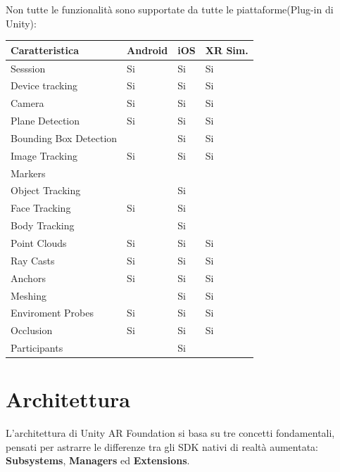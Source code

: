 \begin{center}
Non tutte le funzionalità sono supportate da tutte le piattaforme(Plug-in di Unity):

\begin{tabular}{| l | p{2cm} | p{2cm} |p{2cm} |}
      \hline
      \rowcolor{gray!30}
      \textbf{Caratteristica} & \textbf{Android} & \textbf{iOS} & \textbf{XR Sim.} \\ 
      \hline
      Sesssion & Si & Si & Si\\ 
      \hline
      Device tracking & Si & Si & Si \\ 
      \hline
      Camera & Si & Si & Si \\ 
      \hline
      Plane Detection & Si & Si & Si \\ 
      \hline
      Bounding Box Detection & & Si & Si\\ 
      \hline
      Image Tracking & Si & Si & Si\\ 
      \hline
      Markers &  & & \\ 
      \hline
      Object Tracking & & Si & \\ 
      \hline
      Face Tracking & Si & Si &\\ 
      \hline
      Body Tracking & & Si & \\ 
      \hline
      Point Clouds & Si & Si & Si\\ 
      \hline
      Ray Casts & Si & Si & Si \\
     \hline
      Anchors & Si & Si & Si \\
      \hline
      Meshing &  & Si & Si\\
      \hline
      Enviroment Probes & Si & Si & Si\\
      \hline
      Occlusion & Si & Si & Si\\
      \hline
      Participants &  & Si & \\
      \hline
    \end{tabular}
\end{center}

\section{Architettura}
 
L'architettura di Unity AR Foundation \cite{AR-Foundation-1} si basa su tre concetti fondamentali, pensati per astrarre le differenze tra gli SDK nativi di realtà aumentata: \textbf{Subsystems}, \textbf{Managers} ed \textbf{Extensions}. 

